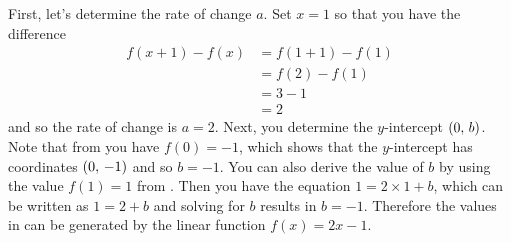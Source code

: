 \documentclass[a4paper,oneside,12pt]{article}
\begin{document}
\begin{solution}
First, let's determine the rate of change $a$.  Set $x = 1$ so that
you have the difference
\begin{align*}
f(x + 1) - f(x)
&=
f(1 + 1) - f(1) \\[4pt]
&=
f(2) - f(1) \\[4pt]
&=
3 - 1 \\[4pt]
&=
2
\end{align*}
and so the rate of change is $a = 2$.  Next, you determine the
$y$-intercept $\left\lparen{0},\, {b}\right\rparen$.  Note that from
 you have
$f(0) = -1$, which shows that the $y$-intercept has coordinates
$\left\lparen{0},\, {-1}\right\rparen$ and so $b = -1$.  You can also derive the value of $b$
by using the value $f(1) = 1$ from
.  Then you have the equation
$1 = 2 \times 1 + b$, which can be written as $1 = 2 + b$ and solving
for $b$ results in $b = -1$.  Therefore the values in
 can be generated by the
linear function $f(x) = 2x - 1$.
\end{solution}

\begin{table}[!htbp]
\centering

\caption{%
  Some values of a linear function $f(x) = ax + b$.
}
\label{tab:function_values_a_3_over_2_b_half}
\end{table}
\end{document}
